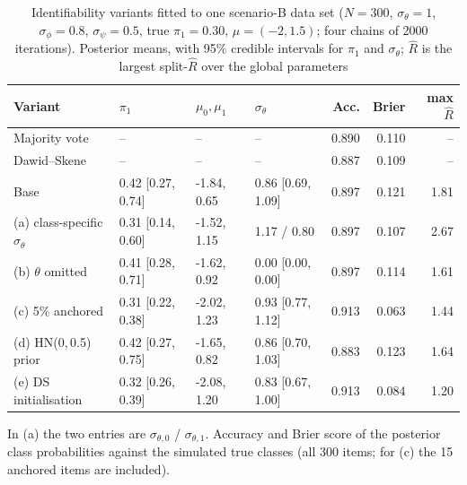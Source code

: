 \begin{table}[htbp]
\centering
\scriptsize
\setlength{\tabcolsep}{3pt}
\caption{Identifiability variants fitted to one scenario-B data set ($N = 300$, $\sigma_\theta = 1$, $\sigma_\phi = 0.8$, $\sigma_\psi = 0.5$, true $\pi_1 = 0.30$, $\mu = (-2, 1.5)$; four chains of 2000 iterations). Posterior means, with 95\% credible intervals for $\pi_1$ and $\sigma_\theta$; $\widehat{R}$ is the largest split-$\widehat{R}$ over the global parameters}\label{tab:ident}
\begin{tabular}{llllrrr}
\toprule
Variant & $\pi_1$ & $\mu_0, \mu_1$ & $\sigma_\theta$ & Acc. & Brier & max $\widehat{R}$ \\
\midrule
Majority vote & -- & -- & -- & 0.890 & 0.110 & -- \\
Dawid--Skene & -- & -- & -- & 0.887 & 0.109 & -- \\
Base & 0.42 [0.27, 0.74] & -1.84, 0.65 & 0.86 [0.69, 1.09] & 0.897 & 0.121 & 1.81 \\
(a) class-specific $\sigma_\theta$ & 0.31 [0.14, 0.60] & -1.52, 1.15 & 1.17 / 0.80 & 0.897 & 0.107 & 2.67 \\
(b) $\theta$ omitted & 0.41 [0.28, 0.71] & -1.62, 0.92 & 0.00 [0.00, 0.00] & 0.897 & 0.114 & 1.61 \\
(c) 5\% anchored & 0.31 [0.22, 0.38] & -2.02, 1.23 & 0.93 [0.77, 1.12] & 0.913 & 0.063 & 1.44 \\
(d) HN(0,\,0.5) prior & 0.42 [0.27, 0.75] & -1.65, 0.82 & 0.86 [0.70, 1.03] & 0.883 & 0.123 & 1.64 \\
(e) DS initialisation & 0.32 [0.26, 0.39] & -2.08, 1.20 & 0.83 [0.67, 1.00] & 0.913 & 0.084 & 1.20 \\
\bottomrule
\end{tabular}
\begin{flushleft}\footnotesize
In (a) the two entries are $\sigma_{\theta,0}$ / $\sigma_{\theta,1}$. Accuracy and Brier score of the posterior class probabilities against the simulated true classes (all 300 items; for (c) the 15 anchored items are included).
\end{flushleft}
\end{table}
